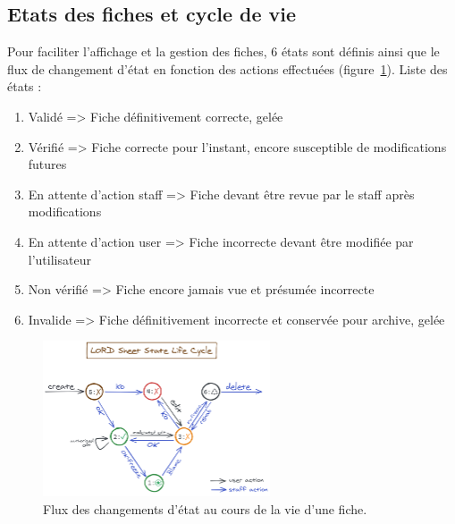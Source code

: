 \documentclass[a4paper,10pt]{article}
\begin{document}
\subsection{Etats des fiches et cycle de vie}
Pour faciliter l'affichage et la gestion des fiches, 6 états sont définis ainsi que le flux de changement d'état en fonction des actions effectuées (figure~\ref{fig:lifecycle}).
Liste des états :
\begin{enumerate}
\item Validé => Fiche définitivement correcte, gelée
\item Vérifié => Fiche correcte pour l'instant, encore susceptible de modifications futures
\item En attente d'action staff => Fiche devant être revue par le staff après modifications
\item En attente d'action user => Fiche incorrecte devant être modifiée par l'utilisateur
\item Non vérifié => Fiche encore jamais vue et présumée incorrecte
\item Invalide => Fiche définitivement incorrecte et conservée pour archive, gelée
\end{enumerate}

\begin{figure}
\begin{center}
\includegraphics[width=0.6\textwidth]{SheetLifecycle.png}
\end{center}
\caption{Flux des changements d'état au cours de la vie d'une fiche.\label{fig:lifecycle}}
\end{figure}
\end{document}
